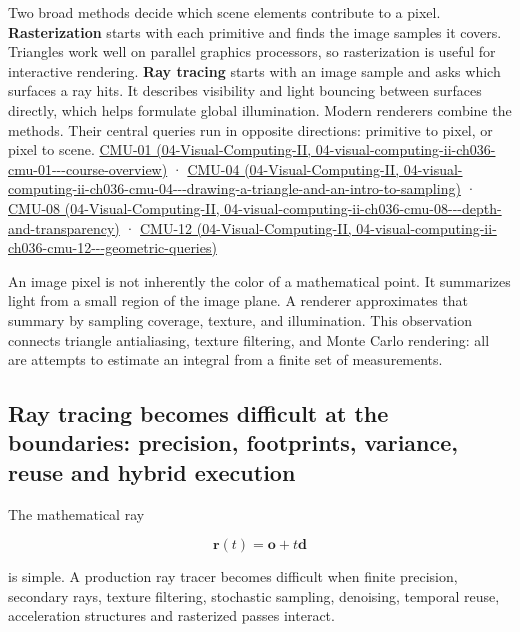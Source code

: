 Two broad methods decide which scene elements contribute to a pixel. \textbf{Rasterization} starts with each primitive and finds the image samples it covers. Triangles work well on parallel graphics processors, so rasterization is useful for interactive rendering. \textbf{Ray tracing} starts with an image sample and asks which surfaces a ray hits. It describes visibility and light bouncing between surfaces directly, which helps formulate global illumination. Modern renderers combine the methods. Their central queries run in opposite directions: primitive to pixel, or pixel to scene. \href{../04-Visual-Computing-II/main.pdf\#nameddest=04-visual-computing-ii-ch036-cmu-01---course-overview}{CMU-01 (04-Visual-Computing-II, 04-visual-computing-ii-ch036-cmu-01-\/-\/-course-overview)} · \href{../04-Visual-Computing-II/main.pdf\#nameddest=04-visual-computing-ii-ch036-cmu-04---drawing-a-triangle-and-an-intro-to-sampling}{CMU-04 (04-Visual-Computing-II, 04-visual-computing-ii-ch036-cmu-04-\/-\/-drawing-a-triangle-and-an-intro-to-sampling)} · \href{../04-Visual-Computing-II/main.pdf\#nameddest=04-visual-computing-ii-ch036-cmu-08---depth-and-transparency}{CMU-08 (04-Visual-Computing-II, 04-visual-computing-ii-ch036-cmu-08-\/-\/-depth-and-transparency)} · \href{../04-Visual-Computing-II/main.pdf\#nameddest=04-visual-computing-ii-ch036-cmu-12---geometric-queries}{CMU-12 (04-Visual-Computing-II, 04-visual-computing-ii-ch036-cmu-12-\/-\/-geometric-queries)}

An image pixel is not inherently the color of a mathematical point. It summarizes light from a small region of the image plane. A renderer approximates that summary by sampling coverage, texture, and illumination. This observation connects triangle antialiasing, texture filtering, and Monte Carlo rendering: all are attempts to estimate an integral from a finite set of measurements.

\subsection{Ray tracing becomes difficult at the boundaries: precision, footprints, variance, reuse and hybrid execution}\label{03-visual-computing-i-ch001-ray-tracing-becomes-difficult-at-the-boundaries-precision-footprints-variance-reuse-and-hybrid-execution}

The mathematical ray

\[
\mathbf r(t)=\mathbf o+t\mathbf d
\]

is simple. A production ray tracer becomes difficult when finite precision, secondary rays, texture filtering, stochastic sampling, denoising, temporal reuse, acceleration structures and rasterized passes interact.

